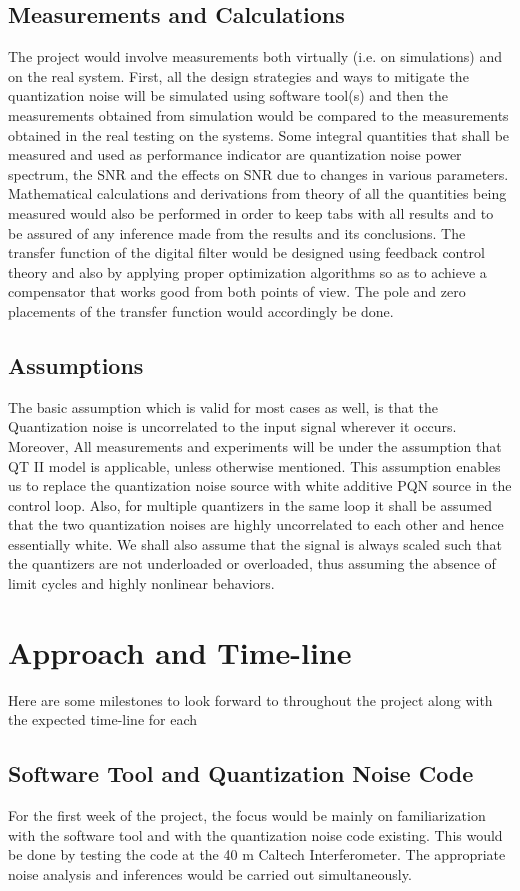\documentclass[colorlinks=true,pdfstartview=FitV,linkcolor=blue,
            citecolor=red,urlcolor=magenta]{ligodoc}
\begin{document}
\subsection{Measurements and Calculations}
The project would involve measurements both virtually (i.e. on simulations) and on the real system. First, all the design strategies and ways to mitigate the quantization noise will be simulated using software tool(s) and then the measurements obtained from simulation would be compared to the measurements obtained in the real testing on the systems. Some integral quantities that shall be measured and used as performance indicator are quantization noise power spectrum, the SNR and the effects on SNR due to changes in various parameters. 
Mathematical calculations and derivations from theory of all the quantities being measured would also be performed in order to keep tabs with all results and to be assured of any inference made from the results and its conclusions. 
The transfer function of the digital filter would be designed using feedback control theory and also by applying proper optimization algorithms so as to achieve a compensator that works good from both points of view. The pole and zero placements of the transfer function would accordingly be done.  
\subsection{Assumptions}
The basic assumption which is valid for most cases as well, is that the Quantization noise is uncorrelated to the input signal wherever it occurs.
Moreover, All measurements and experiments will be under the assumption that QT II model is applicable, unless otherwise mentioned. This assumption enables us to replace the quantization noise source with white additive PQN source in the control loop. Also, for multiple quantizers in the same loop it shall be assumed that the two quantization noises are highly uncorrelated to each other and hence essentially white. 
We shall also assume that the signal is always scaled such that the quantizers are not underloaded or overloaded, thus assuming the absence of limit cycles and highly nonlinear behaviors. 

\section{Approach and Time-line}
Here are some milestones to look forward to throughout the project along with the expected time-line for each
\subsection{Software Tool and Quantization Noise Code} For the first week of the project, the focus would be mainly on familiarization with the software tool and with the quantization noise code existing. This would be done by testing the code at the 40 m Caltech Interferometer. The appropriate noise analysis and inferences would be carried out simultaneously.
\end{document}
